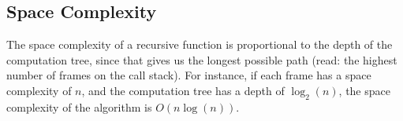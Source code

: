 \subsection{Space Complexity}

The space complexity of a recursive function is proportional to
the depth of the computation tree, since that gives us the longest
possible path (read: the highest number of frames on the call stack).
For instance, if each frame has a space complexity of $n$, and the
computation tree has a depth of $\log_2(n)$, the space complexity
of the algorithm is $O(n\log(n))$.